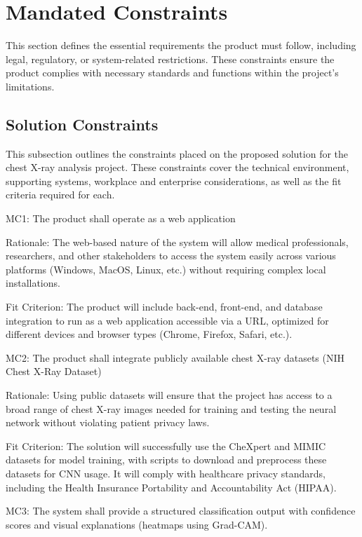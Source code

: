 \documentclass[12pt]{article}
\begin{document}
\section{Mandated Constraints}

This section defines the essential requirements the product must follow, including legal, regulatory, or system-related restrictions. These constraints ensure the product complies with necessary standards and functions within the project's limitations.

\subsection{Solution Constraints}
This subsection outlines the constraints placed on the proposed solution for the chest X-ray analysis project. These constraints cover the technical environment, supporting systems, workplace and enterprise considerations, as well as the fit criteria required for each.

\indent
MC1: The product shall operate as a web application

Rationale: The web-based nature of the system will allow medical professionals, researchers, and other stakeholders to access the system easily across various platforms (Windows, MacOS, Linux, etc.) without requiring complex local installations.

Fit Criterion: The product will include back-end, front-end, and database integration to run as a web application accessible via a URL, optimized for different devices and browser types (Chrome, Firefox, Safari, etc.).

\indent
MC2: The product shall integrate publicly available chest X-ray datasets (NIH Chest X-Ray Dataset)

Rationale: Using public datasets will ensure that the project has access to a broad range of chest X-ray images needed for training and testing the neural network without violating patient privacy laws.

Fit Criterion: The solution will successfully use the CheXpert and MIMIC datasets for model training, with scripts to download and preprocess these datasets for CNN usage. It will comply with healthcare privacy standards, including the Health Insurance Portability and Accountability Act (HIPAA)\cite{hipaa}.

\indent
MC3: The system shall provide a structured classification output with confidence scores and visual explanations (heatmaps using Grad-CAM).
\end{document}
